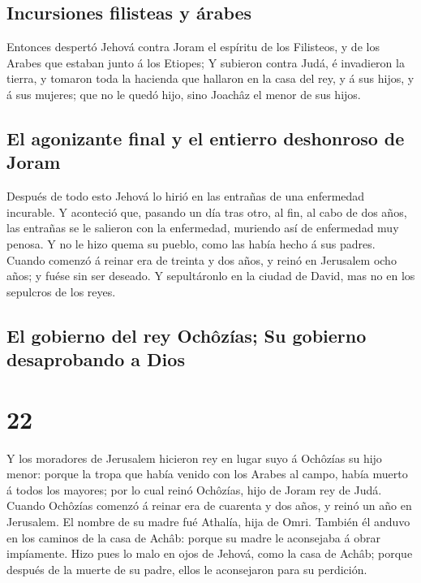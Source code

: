\hypertarget{incursiones-filisteas-y-uxe1rabes}{%
\subsection{Incursiones filisteas y
árabes}\label{incursiones-filisteas-y-uxe1rabes}}

 Entonces despertó Jehová contra Joram el espíritu de los
Filisteos, y de los Arabes que estaban junto á los Etiopes;
 Y subieron contra Judá, é invadieron la tierra, y
tomaron toda la hacienda que hallaron en la casa del rey, y á sus hijos,
y á sus mujeres; que no le quedó hijo, sino Joachâz el menor de sus
hijos.

\hypertarget{el-agonizante-final-y-el-entierro-deshonroso-de-joram}{%
\subsection{El agonizante final y el entierro deshonroso de
Joram}\label{el-agonizante-final-y-el-entierro-deshonroso-de-joram}}

 Después de todo esto Jehová lo hirió en las entrañas de
una enfermedad incurable.  Y aconteció que, pasando un
día tras otro, al fin, al cabo de dos años, las entrañas se le salieron
con la enfermedad, muriendo así de enfermedad muy penosa. Y no le hizo
quema su pueblo, como las había hecho á sus padres. 
Cuando comenzó á reinar era de treinta y dos años, y reinó en Jerusalem
ocho años; y fuése sin ser deseado. Y sepultáronlo en la ciudad de
David, mas no en los sepulcros de los reyes.

\hypertarget{el-gobierno-del-rey-ochuxf4zuxedas-su-gobierno-desaprobando-a-dios}{%
\subsection{El gobierno del rey Ochôzías; Su gobierno desaprobando a
Dios}\label{el-gobierno-del-rey-ochuxf4zuxedas-su-gobierno-desaprobando-a-dios}}

\hypertarget{section-14-22}{%
\section{22}\label{section-14-22}}

 Y los moradores de Jerusalem hicieron rey en lugar suyo á
Ochôzías su hijo menor: porque la tropa que había venido con los Arabes
al campo, había muerto á todos los mayores; por lo cual reinó Ochôzías,
hijo de Joram rey de Judá.  Cuando Ochôzías comenzó á
reinar era de cuarenta y dos años, y reinó un año en Jerusalem. El
nombre de su madre fué Athalía, hija de Omri.  También él
anduvo en los caminos de la casa de Achâb: porque su madre le aconsejaba
á obrar impíamente.  Hizo pues lo malo en ojos de Jehová,
como la casa de Achâb; porque después de la muerte de su padre, ellos le
aconsejaron para su perdición.

